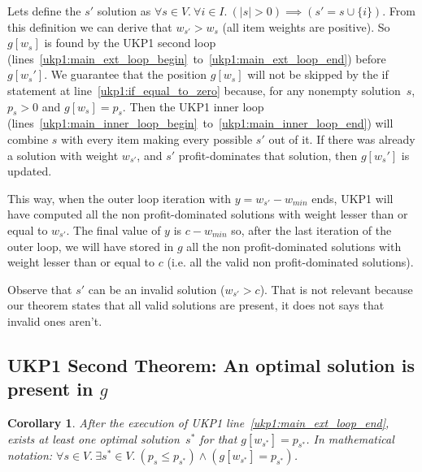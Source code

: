 \documentclass[12pt]{article}
\newtheorem{corollary}{Corollary}
\begin{document}
Lets define the \(s'\) solution as \(\forall s \in V.~\forall i \in I.~(|s| > 0) \implies (s' = s \cup \{i\})\). From this definition we can derive that \(w_{s'} > w_s\) (all item weights are positive). So \(g[w_s]\) is found by the UKP1 second loop (lines~\ref{ukp1:main_ext_loop_begin}~to~\ref{ukp1:main_ext_loop_end}) before \(g[w_s']\). We guarantee that the position \(g[w_s]\) will not be skipped by the if statement at line~\ref{ukp1:if_equal_to_zero} because, for any nonempty solution~\(s\), \(p_s > 0\) and \(g[w_s] = p_s\). Then the UKP1 inner loop (lines~\ref{ukp1:main_inner_loop_begin}~to~\ref{ukp1:main_inner_loop_end}) will combine \(s\) with every item making every possible \(s'\) out of it. If there was already a solution with weight \(w_{s'}\), and \(s'\) profit-dominates that solution, then \(g[w_s']\) is updated.

This way, when the outer loop iteration with \(y = w_{s'}-w_{min}\) ends, UKP1 will have computed all the non profit-dominated solutions with weight lesser than or equal to \(w_{s'}\). The final value of \(y\) is \(c-w_{min}\) so, after the last iteration of the outer loop, we will have stored in \(g\) all the non profit-dominated solutions with weight lesser than or equal to \(c\) (i.e. all the valid non profit-dominated solutions).

Observe that \(s'\) can be an invalid solution (\(w_{s'} > c\)). That is not relevant because our theorem states that all valid solutions are present, it does not says that invalid ones aren't.

\subsection{UKP1 Second Theorem: An optimal solution is present in \(g\)}

\begin{corollary}\label{theo:ukp1:opt_is_present}
After the execution of UKP1 line~\ref{ukp1:main_ext_loop_end}, exists at least one optimal solution~\(s^*\) for that \(g[w_{s^*}] = p_{s^*}\). In mathematical notation: \(\forall s \in V.~\exists s^* \in V.~(p_{s} \leq p_{s^*}) \land (g[w_{s^*}] = p_{s^*})\).
\end{corollary}
\end{document}
